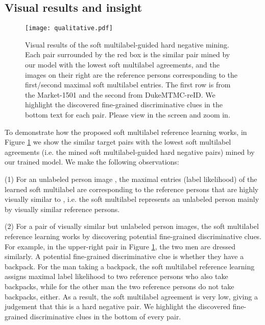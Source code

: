 \documentclass[10pt,twocolumn,letterpaper]{article}
\newcommand{\red}[1]{{\color{red}#1}}
\begin{document}
\subsection{Visual results and insight}\label{sec:qualitative}


\begin{figure}[t]
\begin{center}
\texttt{[image: qualitative.pdf]}
\vspace{-0.1cm}
\end{center}
   \caption{Visual results of the soft multilabel-guided hard negative mining.
   Each pair surrounded by the \red{red box} is the similar pair mined by our model with the lowest soft multilabel agreements,
   and the images on their right are the reference persons corresponding to the first/second maximal soft multilabel entries.
   The first row is from the Market-1501 and the second from DukeMTMC-reID.
   We highlight the discovered fine-grained discriminative clues in the bottom text for each pair.
   Please view in the screen and zoom in.
   }
\label{fig:qualitative}
\end{figure}


To demonstrate how the proposed soft multilabel reference learning works,
in Figure \ref{fig:qualitative} we show the similar target pairs with the lowest soft multilabel agreements
(i.e. the mined soft multilabel-guided hard negative pairs) mined by our trained model.
We make the following observations:

(1) For an unlabeled person image , the maximal entries (label likelihood) of the learned soft multilabel
are corresponding to the reference persons that are highly visually similar to ,
i.e. the soft multilabel represents an unlabeled person mainly by visually similar reference persons.

(2) For a pair of visually similar but unlabeled person images,
the soft multilabel reference learning works by discovering potential fine-grained discriminative clues.
For example, in the upper-right pair in Figure \ref{fig:qualitative},
the two men are dressed similarly.
A potential fine-grained discriminative clue is whether they have a backpack.
For the man taking a backpack, the soft multilabel reference learning assigns maximal
label likelihood to two reference persons who also take backpacks,
while for the other man the two reference persons do not take backpacks, either.
As a result, the soft multilabel agreement is very low, giving a judgement that this is a hard negative pair.
We highlight the discovered fine-grained discriminative clues in the bottom of every pair.
\end{document}
